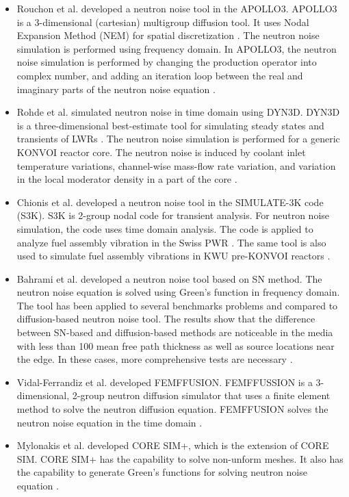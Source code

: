 \begin{itemize}
    \item Rouchon et al. developed a neutron noise tool in the APOLLO3. APOLLO3 is a 3-dimensional (cartesian) multigroup diffusion tool. It uses Nodal Expansion Method (NEM) for spatial discretization \cite{schneiderAPOLLO3CEADeterministic2016}. The neutron noise simulation is performed using frequency domain. In APOLLO3, the neutron noise simulation is performed by changing the production operator into complex number, and adding an iteration loop between the real and imaginary parts of the neutron noise equation \cite{rouchonNew3DMultigroup2017}.
    \item Rohde et al. simulated neutron noise in time domain using DYN3D. DYN3D is a three-dimensional best-estimate tool for simulating steady states and transients of LWRs \cite{rohdeReactorDynamicsCode2016}. The neutron noise simulation is performed for a generic KONVOI reactor core. The neutron noise is induced by coolant inlet temperature variations, channel-wise mass-flow rate variation, and variation in the local moderator density in a part of the core \cite{rohdeNeutronNoiseObservations2018}.
    \item Chionis et al. developed a neutron noise tool in the SIMULATE-3K code (S3K). S3K is 2-group nodal code for transient analysis. For neutron noise simulation, the code uses time domain analysis. The code is applied to analyze fuel assembly vibration in the Swiss PWR \cite{chionisSIMULATE3KAnalysesNeutron2017}. The same tool is also used to simulate fuel assembly vibrations in KWU pre-KONVOI reactors \cite{vermaModellingAnalysisFuel2021}.
    \item Bahrami et al. developed a neutron noise tool based on SN method. The neutron noise equation is solved using Green’s function in frequency domain. The tool has been applied to several benchmarks problems and compared to diffusion-based neutron noise tool. The results show that the difference between SN-based and diffusion-based methods are noticeable in the media with less than 100 mean free path thickness as well as source locations near the edge. In these cases, more comprehensive tests are necessary \cite{bahramiSNTransportMethod2018}.
    \item Vidal-Ferrandiz et al. developed FEMFFUSION. FEMFFUSSION is a 3-dimensional, 2-group neutron diffusion simulator that uses a finite element method to solve the neutron diffusion equation. FEMFFUSION solves the neutron noise equation in the time domain \cite{vidal-ferrandizNeutronicSimulationFuel2020}.
    \item Mylonakis et al. developed CORE SIM+, which is the extension of CORE SIM. CORE SIM+ has the capability to solve non-unform meshes. It also has the capability to generate Green’s functions for solving neutron noise equation \cite{mylonakisCORESIMFlexible2021}.

\end{itemize}
